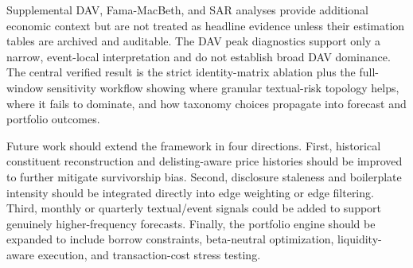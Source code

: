 \documentclass[11pt, a4paper]{article}
\begin{document}
Supplemental DAV, Fama-MacBeth, and SAR analyses provide additional economic context but are not treated as headline evidence unless their estimation tables are archived and auditable. The DAV peak diagnostics support only a narrow, event-local interpretation and do not establish broad DAV dominance. The central verified result is the strict identity-matrix ablation plus the full-window sensitivity workflow showing where granular textual-risk topology helps, where it fails to dominate, and how taxonomy choices propagate into forecast and portfolio outcomes.

Future work should extend the framework in four directions. First, historical constituent reconstruction and delisting-aware price histories should be improved to further mitigate survivorship bias. Second, disclosure staleness and boilerplate intensity should be integrated directly into edge weighting or edge filtering. Third, monthly or quarterly textual/event signals could be added to support genuinely higher-frequency forecasts. Finally, the portfolio engine should be expanded to include borrow constraints, beta-neutral optimization, liquidity-aware execution, and transaction-cost stress testing.
\newpage
\end{document}

